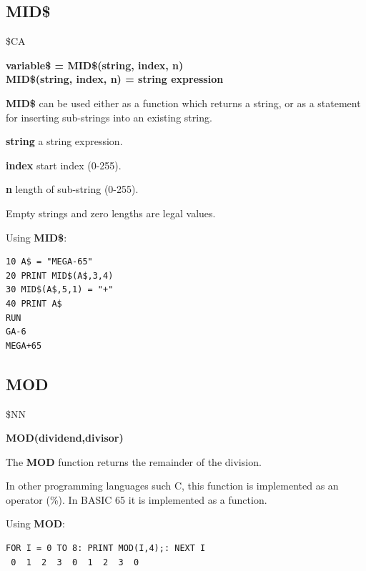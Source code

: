 \subsection{MID\$}
\begin{description}[leftmargin=2cm,style=nextline]
\item [Token:] \$CA
\item [Format:] {\bf variable\$ = MID\$(string, index, n)} \\
                {\bf MID\$(string, index, n) = string expression}
\item [Usage:]  {\bf MID\$} can be used either as a function
                which returns a string, or as a statement for
                inserting sub-strings into an existing string.

               {\bf string} a string expression.

               {\bf index} start index (0-255).

               {\bf n} length of sub-string (0-255).

\item [Remarks:] Empty strings and zero lengths are legal values.

\item [Example:] Using {\bf MID\$}:
\begin{tcolorbox}[colback=black,coltext=white]
\verbatimfont{\codefont}
\begin{verbatim}
10 A$ = "MEGA-65"
20 PRINT MID$(A$,3,4)
30 MID$(A$,5,1) = "+"
40 PRINT A$
RUN
GA-6
MEGA+65
\end{verbatim}
\end{tcolorbox}
\end{description}


\newpage
\subsection{MOD}
\begin{description}[leftmargin=2cm,style=nextline]
\item [Token:] \$NN
\item [Format:] {\bf MOD(dividend,divisor)}
\item [Usage:] The {\bf MOD} function returns the remainder of the
      division.
\item [Remarks:] In other programming languages such C, this function
      is implemented as an operator (\%). In BASIC 65 it is implemented as a function.

\item [Example:] Using {\bf MOD}:
\begin{tcolorbox}[colback=black,coltext=white]
\verbatimfont{\codefont}
\begin{verbatim}
FOR I = 0 TO 8: PRINT MOD(I,4);: NEXT I
 0  1  2  3  0  1  2  3  0
\end{verbatim}
\end{tcolorbox}
\end{description}


